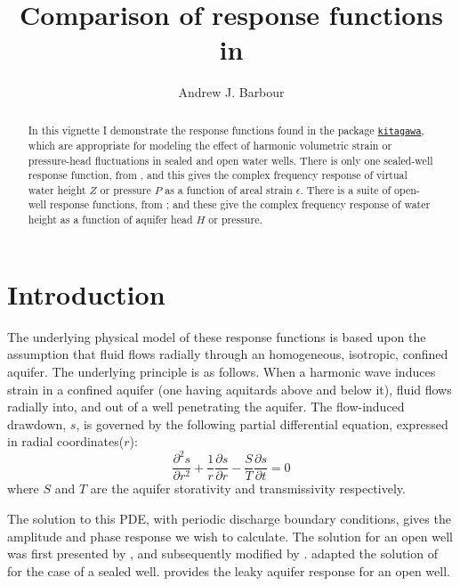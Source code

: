 \documentclass[12pt]{article}\usepackage[]{graphicx}\usepackage[]{color}
\author{Andrew J. Barbour}
\title{Comparison of response functions in \kit{}}
\begin{document}
%
\newcommand{\SC}[1]{\textsc{#1}}
\newcommand{\Rcmd}[1]{\texttt{#1}}
\newcommand{\kit}[0]{\href{https://abarbour.github.io/kitagawa/}{\color{blue}\Rcmd{kitagawa}}}
\newcommand{\bidxa}[1]{\index{#1}{\textbf{#1}}} 
\newcommand{\bidxb}[2]{\index{#2}{\textbf{#1}}} 
\newcommand{\idxa}[1]{\index{#1}{#1}} 
\newcommand{\idxb}[2]{\index{#2}{#1}} 
%
\maketitle
%
\begin{abstract}
In this vignette I demonstrate the response functions found in 
the package
\kit{}, which are appropriate for modeling the effect of
harmonic volumetric strain or pressure-head fluctuations in
sealed and open water wells.
There is only one sealed-well response function, from
\citet{kitagawa2011}, and this gives the complex frequency response of
virtual water height $Z$ or pressure $P$ as a function of
areal %
strain $\epsilon$.
There is a suite of open-well response functions, from 
\citet{cooper1965, hsieh1987, rojstaczer1988, liu1989, wang2018}; and
these give the complex frequency response of
water height as a function of aquifer head $H$ or pressure.
\end{abstract}
%
\tableofcontents

\clearpage
\section{Introduction}

 The underlying physical model of these response functions
 is based upon the assumption that fluid flows radially
 through an homogeneous, isotropic, confined aquifer.
%
 The underlying principle is as follows.  When a harmonic wave induces
 strain in a confined aquifer (one having aquitards above and below it), 
 fluid flows radially into, and out of a well penetrating the aquifer.
 The flow-induced drawdown, $s$, is governed by the following 
 partial differential equation, expressed in radial coordinates($r$):
\begin{equation}
 \frac{\partial^2 s}{\partial r^2} + \frac{1}{r} 
 \frac{\partial s}{ \partial r} - \frac{S}{T}\frac{\partial s}{\partial t} = 0
\end{equation}
 where $S$ and $T$ are the aquifer storativity and transmissivity respectively.
 
 The solution to this PDE, with periodic discharge boundary conditions,
 gives the amplitude and phase response we wish to calculate.
 The solution  for an open well was first presented by
 \citet{cooper1965}, and subsequently modified by \citet{rojstaczer1988, liu1989}.
 \citet{kitagawa2011} adapted the solution
 of \citet{hsieh1987} for the case of a sealed well. 
 \citet{wang2018} provides the leaky aquifer response for an open well.
 
\end{document}
